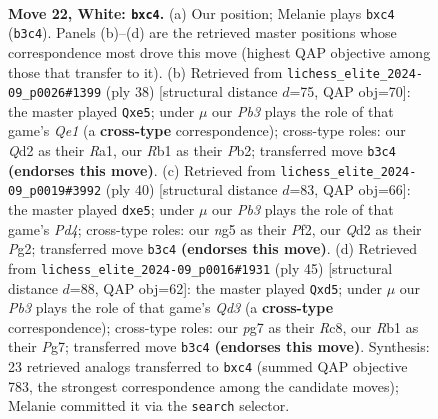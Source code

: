 \documentclass[11pt]{article}
\begin{document}
\clearpage

\begin{figure}[p]\centering
\begin{subfigure}{0.46\textwidth}\centering
\resizebox{\linewidth}{!}{%
\newchessgame
\chessboard[
  setfen={1r2q1k1/p1pp1ppp/8/6n1/1pbP4/1P6/P1PQBP1P/1R4K1 w - - 0 22},
  showmover=false,
  pgfstyle=straightmove, color=movearrow, markmove={b3-c4}
]}
\caption{}
\end{subfigure}\hfill
\begin{subfigure}{0.46\textwidth}\centering
\resizebox{\linewidth}{!}{%
\newchessgame
\chessboard[
  setfen={r5k1/pppq1p1p/6p1/3pbn2/P2P1B2/2P5/1P3PPP/R3Q1K1 w - - 0 20},
  showmover=false,
  pgfstyle=straightmove, color=movearrow, markmove={e1-e5}
]}
\caption{}
\end{subfigure}
\\[4pt]
\begin{subfigure}{0.46\textwidth}\centering
\resizebox{\linewidth}{!}{%
\newchessgame
\chessboard[
  setfen={r5k1/pppq1pnp/6p1/3pb3/3P1B2/2P1Q2P/PP3PP1/R5K1 w - - 0 21},
  showmover=false,
  pgfstyle=straightmove, color=movearrow, markmove={d4-e5}
]}
\caption{}
\end{subfigure}\hfill
\begin{subfigure}{0.46\textwidth}\centering
\resizebox{\linewidth}{!}{%
\newchessgame
\chessboard[
  setfen={2r3k1/5ppp/p2qp3/bp1BN3/n2P4/P3P3/5PPP/B2Q1RK1 b - - 0 23},
  showmover=false,
  pgfstyle=straightmove, color=movearrow, markmove={d6-d5}
]}
\caption{}
\end{subfigure}
\caption{\textbf{Move 22, White: \texttt{bxc4}.} (a) Our position; Melanie plays \texttt{bxc4} (\texttt{b3c4}). Panels (b)--(d) are the retrieved master positions whose correspondence most drove this move (highest QAP objective among those that transfer to it). (b) Retrieved from \texttt{lichess\_elite\_2024-09\_p0026\#1399} (ply 38) [structural distance $d$=75, QAP obj=70]: the master played \texttt{Qxe5}; under $\mu$ our \emph{Pb3} plays the role of that game's \emph{Qe1} (a \textbf{cross-type} correspondence); cross-type roles: our \emph{Q}d2 as their \emph{R}a1, our \emph{R}b1 as their \emph{P}b2; transferred move \texttt{b3c4} \textbf{(endorses this move)}. (c) Retrieved from \texttt{lichess\_elite\_2024-09\_p0019\#3992} (ply 40) [structural distance $d$=83, QAP obj=66]: the master played \texttt{dxe5}; under $\mu$ our \emph{Pb3} plays the role of that game's \emph{Pd4}; cross-type roles: our \emph{n}g5 as their \emph{P}f2, our \emph{Q}d2 as their \emph{P}g2; transferred move \texttt{b3c4} \textbf{(endorses this move)}. (d) Retrieved from \texttt{lichess\_elite\_2024-09\_p0016\#1931} (ply 45) [structural distance $d$=88, QAP obj=62]: the master played \texttt{Qxd5}; under $\mu$ our \emph{Pb3} plays the role of that game's \emph{Qd3} (a \textbf{cross-type} correspondence); cross-type roles: our \emph{p}g7 as their \emph{R}c8, our \emph{R}b1 as their \emph{P}g7; transferred move \texttt{b3c4} \textbf{(endorses this move)}. Synthesis: 23 retrieved analogs transferred to \texttt{bxc4} (summed QAP objective 783, the strongest correspondence among the candidate moves); Melanie committed it via the \texttt{search} selector.}
\label{fig:thought-m42}
\end{figure}
\end{document}
